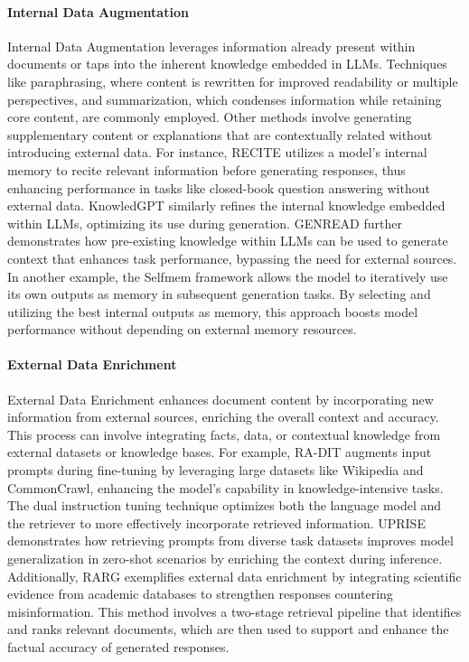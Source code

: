 \paragraph{Internal Data Augmentation}
Internal Data Augmentation leverages information already present within documents or taps into the inherent knowledge embedded in LLMs. Techniques like paraphrasing, where content is rewritten for improved readability or multiple perspectives, and summarization, which condenses information while retaining core content, are commonly employed. Other methods involve generating supplementary content or explanations that are contextually related without introducing external data. For instance, RECITE \cite{sun2023recitationaugmented} utilizes a model’s internal memory to recite relevant information before generating responses, thus enhancing performance in tasks like closed-book question answering without external data. KnowledGPT \cite{wang2023knowledgpt} similarly refines the internal knowledge embedded within LLMs, optimizing its use during generation. GENREAD \cite{yu2023generate} further demonstrates how pre-existing knowledge within LLMs can be used to generate context that enhances task performance, bypassing the need for external sources. In another example, the Selfmem \cite{cheng2023lift} framework allows the model to iteratively use its own outputs as memory in subsequent generation tasks. By selecting and utilizing the best internal outputs as memory, this approach boosts model performance without depending on external memory resources.

\paragraph{External Data Enrichment}
External Data Enrichment enhances document content by incorporating new information from external sources, enriching the overall context and accuracy. This process can involve integrating facts, data, or contextual knowledge from external datasets or knowledge bases. For example, RA-DIT \cite{lin2024radit} augments input prompts during fine-tuning by leveraging large datasets like Wikipedia and CommonCrawl, enhancing the model’s capability in knowledge-intensive tasks. The dual instruction tuning technique optimizes both the language model and the retriever to more effectively incorporate retrieved information. UPRISE \cite{cheng2023uprise} demonstrates how retrieving prompts from diverse task datasets improves model generalization in zero-shot scenarios by enriching the context during inference. Additionally, RARG \cite{yue2024evidencedriven} exemplifies external data enrichment by integrating scientific evidence from academic databases to strengthen responses countering misinformation. This method involves a two-stage retrieval pipeline that identifies and ranks relevant documents, which are then used to support and enhance the factual accuracy of generated responses.
